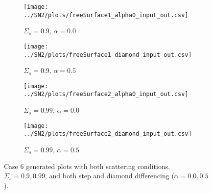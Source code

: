 \documentclass{NE515}
\theoremstyle{definition}
\begin{document}
    \begin{figure}
        \centering
        \begin{subfigure}{0.45\linewidth}
            \centering
            \texttt{[image: ../SN2/plots/freeSurface1\_alpha0\_input\_out.csv]}
            \caption{$\Sigma_s=0.9$, $\alpha=0.0$}
        \end{subfigure}
        \hfill
        \begin{subfigure}{0.45\linewidth}
            \centering
            \texttt{[image: ../SN2/plots/freeSurface1\_diamond\_input\_out.csv]}
            \caption{$\Sigma_s=0.9$, $\alpha=0.5$}
        \end{subfigure}
        \hfill
        \begin{subfigure}{0.45\linewidth}
            \centering
            \texttt{[image: ../SN2/plots/freeSurface2\_alpha0\_input\_out.csv]}
            \caption{$\Sigma_s=0.99$, $\alpha=0.0$}
        \end{subfigure}
        \hfill
        \begin{subfigure}{0.45\linewidth}
            \centering
            \texttt{[image: ../SN2/plots/freeSurface2\_diamond\_input\_out.csv]}
            \caption{$\Sigma_s=0.99$, $\alpha=0.5$}
        \end{subfigure}

        \caption{Case 6 generated plots with both scattering conditions, $\Sigma_s = 0.9, 0.99$, and both step and diamond differencing ($\alpha=0.0,0.5$).}
        \label{fig:case-6}
    \end{figure}

    \clearpage
\end{document}
